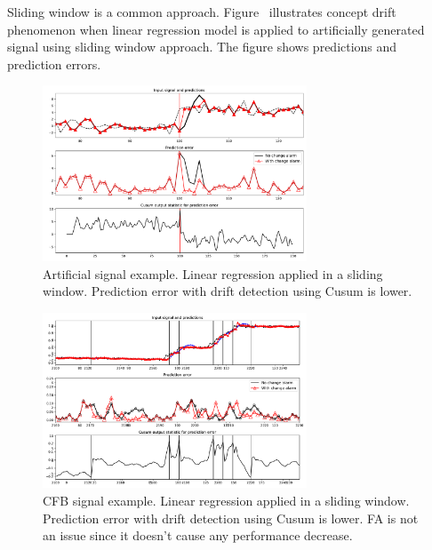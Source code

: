 \documentclass[12 pt]{article}
\begin{document}
  Sliding window is a common approach.
  Figure~\cite{fig:art_sig_example} illustrates concept drift phenomenon when linear regression model is applied to artificially generated signal using sliding window approach. 
  The figure shows predictions and prediction errors.
  \begin{figure}[!htb]
    \centering
    \includegraphics[width=0.7\textwidth]{images/proof_of_concept_linreg_art_sig}
    \caption{Artificial signal example. Linear regression applied in a sliding window. Prediction error with drift detection using Cusum is lower.}\label{fig:art_sig_example}
  \end{figure}
  \begin{figure}[!htb]
    \centering
    \includegraphics[width=0.7\textwidth]{images/proof_of_concept_linreg_cfb_sig}
    \caption{CFB signal example. 
             Linear regression applied in a sliding window. 
             Prediction error with drift detection using Cusum is lower. 
             FA is not an issue since it doesn't cause any performance decrease.}\label{fig:cfb_sig_linreg_proof_of_concept}
  \end{figure}
\end{document}
